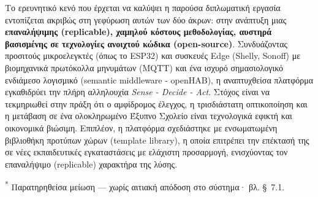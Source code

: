 Το ερευνητικό κενό που έρχεται να καλύψει η παρούσα διπλωματική εργασία εντοπίζεται ακριβώς στη γεφύρωση αυτών των δύο άκρων: στην ανάπτυξη μιας \textbf{επαναλήψιμης (\textlatin{replicable}), χαμηλού κόστους μεθοδολογίας, αυστηρά βασισμένης σε τεχνολογίες ανοιχτού κώδικα (\textlatin{open-source})}. Συνδυάζοντας προσιτούς μικροελεγκτές (όπως το \textlatin{ESP32}) και συσκευές \textlatin{Edge} (\textlatin{Shelly, Sonoff}) με βιομηχανικά πρωτόκολλα μηνυμάτων (\textlatin{MQTT}) και ένα ισχυρό σημασιολογικό ενδιάμεσο λογισμικό (\textlatin{semantic middleware - openHAB}), η αναπτυχθείσα πλατφόρμα εγκαθιδρύει την πλήρη αλληλουχία \textit{\textlatin{Sense - Decide - Act}}. Στόχος είναι να τεκμηριωθεί στην πράξη ότι ο αμφίδρομος έλεγχος, η τρισδιάστατη οπτικοποίηση και η μετάβαση σε ένα ολοκληρωμένο Έξυπνο Σχολείο είναι τεχνολογικά εφικτή και οικονομικά βιώσιμη. Επιπλέον, η πλατφόρμα σχεδιάστηκε με ενσωματωμένη βιβλιοθήκη προτύπων χώρων (\textlatin{template library}), η οποία επιτρέπει την επέκτασή της σε νέες εκπαιδευτικές εγκαταστάσεις με ελάχιστη προσαρμογή, ενισχύοντας τον επαναλήψιμο (\textlatin{replicable}) χαρακτήρα της λύσης. 

\begin{table}[htbp]
\centering
\setlength{\tabcolsep}{4pt}
\renewcommand{\arraystretch}{1.1}
\caption{Συγκριτική ανάλυση παραδοσιακής διαχείρισης έναντι Ψηφιακού Διδύμου}
\label{tab:traditional_vs_dt}
\end{table}
\noindent\textsuperscript{*} Παρατηρηθείσα μείωση --- χωρίς αιτιακή απόδοση στο σύστημα· βλ. \S~7.1.

